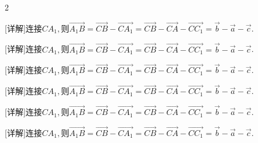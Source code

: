 \documentclass[fontset=none]{ctexart}
\begin{document}
\begin{multicols}{2}
\noindent\begin{minipage}[t]{46.368mm}\raggedright [详解]连接\(CA_{1},\)则\nobreak\(\overrightarrow{A_{1}B} = \overrightarrow{CB} - \overrightarrow{CA_{1}} = \overrightarrow{CB} - \overrightarrow{CA} - \overrightarrow{CC_{1}} =\overrightarrow{b} - \overrightarrow{a} - \overrightarrow{c}\).\end{minipage}\par
\vspace{2mm}
\noindent\begin{minipage}[t]{47.500mm}\raggedright [详解]连接\(CA_{1},\)则\nobreak\(\overrightarrow{A_{1}B} = \overrightarrow{CB} - \overrightarrow{CA_{1}} = \overrightarrow{CB} - \overrightarrow{CA} - \overrightarrow{CC_{1}} =\overrightarrow{b} - \overrightarrow{a} - \overrightarrow{c}\).\end{minipage}\par
\vspace{2mm}
\noindent\begin{minipage}[t]{48.500mm}\raggedright [详解]连接\(CA_{1},\)则\nobreak\(\overrightarrow{A_{1}B} = \overrightarrow{CB} - \overrightarrow{CA_{1}} = \overrightarrow{CB} - \overrightarrow{CA} - \overrightarrow{CC_{1}} =\overrightarrow{b} - \overrightarrow{a} - \overrightarrow{c}\).\end{minipage}\par
\vspace{2mm}
\noindent\begin{minipage}[t]{49.500mm}\raggedright [详解]连接\(CA_{1},\)则\nobreak\(\overrightarrow{A_{1}B} = \overrightarrow{CB} - \overrightarrow{CA_{1}} = \overrightarrow{CB} - \overrightarrow{CA} - \overrightarrow{CC_{1}} =\overrightarrow{b} - \overrightarrow{a} - \overrightarrow{c}\).\end{minipage}\par
\vspace{2mm}
\noindent\begin{minipage}[t]{50.500mm}\raggedright [详解]连接\(CA_{1},\)则\nobreak\(\overrightarrow{A_{1}B} = \overrightarrow{CB} - \overrightarrow{CA_{1}} = \overrightarrow{CB} - \overrightarrow{CA} - \overrightarrow{CC_{1}} =\overrightarrow{b} - \overrightarrow{a} - \overrightarrow{c}\).\end{minipage}\par
\vspace{2mm}
\noindent\begin{minipage}[t]{52.000mm}\raggedright [详解]连接\(CA_{1},\)则\nobreak\(\overrightarrow{A_{1}B} = \overrightarrow{CB} - \overrightarrow{CA_{1}} = \overrightarrow{CB} - \overrightarrow{CA} - \overrightarrow{CC_{1}} =\overrightarrow{b} - \overrightarrow{a} - \overrightarrow{c}\).\end{minipage}\par
\vspace{2mm}
\end{multicols}
\end{document}
